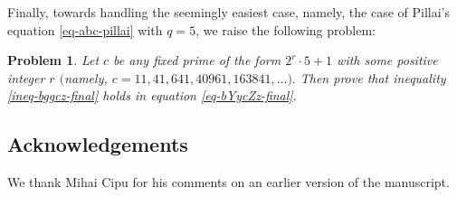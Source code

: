 \documentclass[11pt]{amsart}
\newtheorem{prob}{Problem}%
\numberwithin{equation}{section}
\begin{document}
Finally, towards handling the seemingly easiest case, namely, the case of Pillai's equation \eqref{eq-abc-pillai} with $q=5$, we raise the following problem:

\begin{prob}\label{prob-E5}
Let $c$ be any fixed prime of the form $2^r \cdot 5+1$ with some positive integer $r$ $($namely, $c=11, 41, 641, 40961, 163841, \ldots).$ 
Then prove that inequality \eqref{ineq-bggcz-final} holds in equation \eqref{eq-bYycZz-final}$.$
\end{prob}

\subsection*{Acknowledgements}
We thank Mihai Cipu for his comments on an earlier version of the manuscript.
\end{document}

